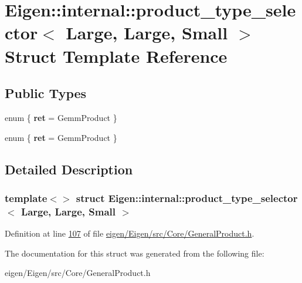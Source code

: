 \hypertarget{struct_eigen_1_1internal_1_1product__type__selector_3_01_large_00_01_large_00_01_small_01_4}{}\section{Eigen\+:\+:internal\+:\+:product\+\_\+type\+\_\+selector$<$ Large, Large, Small $>$ Struct Template Reference}
\label{struct_eigen_1_1internal_1_1product__type__selector_3_01_large_00_01_large_00_01_small_01_4}
\subsection*{Public Types}
\begin{DoxyCompactItemize}
\item 
\mbox{\label{struct_eigen_1_1internal_1_1product__type__selector_3_01_large_00_01_large_00_01_small_01_4_acb9adb67c10ea19c8db97da20f0cbe32}} 
enum \{ {\bfseries ret} = Gemm\+Product
 \}
\item 
\mbox{\label{struct_eigen_1_1internal_1_1product__type__selector_3_01_large_00_01_large_00_01_small_01_4_a6a010da3d97ad185ad15b94eee435ba8}} 
enum \{ {\bfseries ret} = Gemm\+Product
 \}
\end{DoxyCompactItemize}


\subsection{Detailed Description}
\subsubsection*{template$<$$>$\newline
struct Eigen\+::internal\+::product\+\_\+type\+\_\+selector$<$ Large, Large, Small $>$}



Definition at line \hyperlink{eigen_2_eigen_2src_2_core_2_general_product_8h_source_l00107}{107} of file \hyperlink{eigen_2_eigen_2src_2_core_2_general_product_8h_source}{eigen/\+Eigen/src/\+Core/\+General\+Product.\+h}.



The documentation for this struct was generated from the following file\+:\begin{DoxyCompactItemize}
\item 
eigen/\+Eigen/src/\+Core/\+General\+Product.\+h\end{DoxyCompactItemize}

